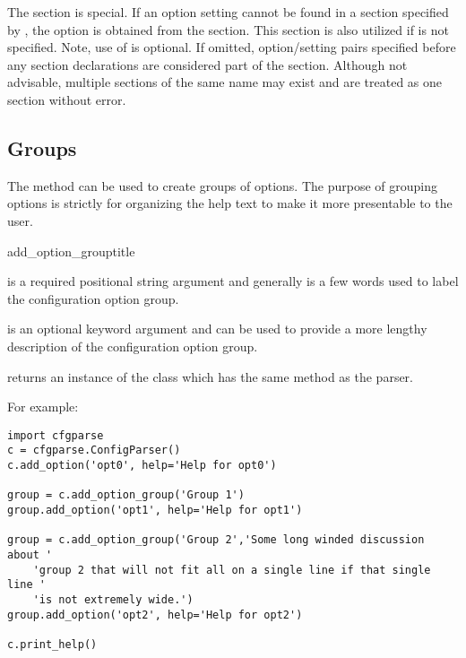 \documentclass{howto}
\begin{document}
The \code{[DEFAULT]} section is special.  If an option setting cannot be found
in a section specified by , the option is obtained from the 
\code{[DEFAULT]} section.  This section is also utilized if  is not
specified.  Note, use of \code{[DEFAULT]} is optional.  If omitted, option/setting
pairs specified before any section declarations are considered part of the
\code{[DEFAULT]} section.  Although not advisable, multiple sections of the
same name may exist and are treated as one section without error.

\subsection{Groups\label{cfgparse-groups}}

The  method can be used to create groups of options.  
The purpose of grouping options is strictly for organizing the help text
to make it more presentable to the user.

  \begin{funcdesc}{add_option_group}{title}

     is a required positional string argument and generally is
        a few words used to label the configuration option group.
        
     is an optional keyword argument and can be used to
       provide a more lengthy description of the configuration option group.
  
  \end{funcdesc}

 returns an instance of the  class
which has the same  method as the parser.
  
For example:

\begin{verbatim}
import cfgparse
c = cfgparse.ConfigParser()
c.add_option('opt0', help='Help for opt0')

group = c.add_option_group('Group 1')
group.add_option('opt1', help='Help for opt1')

group = c.add_option_group('Group 2','Some long winded discussion about '
    'group 2 that will not fit all on a single line if that single line '
    'is not extremely wide.')
group.add_option('opt2', help='Help for opt2')

c.print_help()
\end{verbatim}
\end{document}
